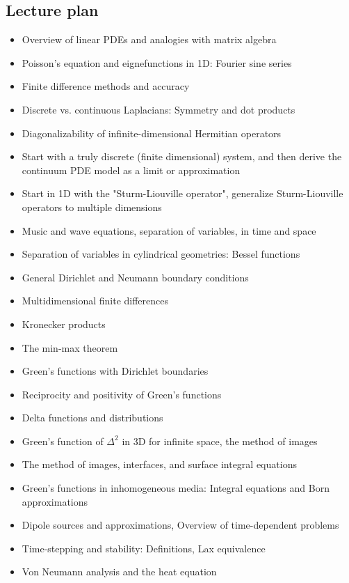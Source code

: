 \documentclass{article}
\theoremstyle{mytheoremstyle}
\theoremstyle{mytheoremstyle}
\theoremstyle{myproblemstyle}
\begin{document}
    \subsection{Lecture plan}
    \begin{itemize}
    	\item Overview of linear PDEs and analogies with matrix algebra
	\item Poisson's equation and eignefunctions in 1D: Fourier
		sine series
	\item Finite difference methods and accuracy
	\item Discrete vs. continuous Laplacians: Symmetry and dot products
	\item Diagonalizability of infinite-dimensional Hermitian operators
	\item Start with a truly discrete (finite dimensional) system,
		and then derive the continuum PDE model as a limit or
		approximation
	\item Start in 1D with the "Sturm-Liouville operator", generalize
		Sturm-Liouville operators to multiple dimensions
	\item Music and wave equations, separation of variables, in time
		and space
	\item Separation of variables in cylindrical geometries: Bessel
		functions
	\item General Dirichlet and Neumann boundary conditions
	\item Multidimensional finite differences
	\item Kronecker products
	\item The min-max theorem
	\item Green's functions with Dirichlet boundaries
	\item Reciprocity and positivity of Green's functions
	\item Delta functions and distributions
	\item Green's function of $ \Delta^2 $ in 3D for infinite space,
		the method of images
	\item The method of images, interfaces, and surface integral
		equations
	\item Green's functions in inhomogeneous media: Integral equations
		and Born approximations
	\item Dipole sources and approximations, Overview of time-dependent
		problems
	\item Time-stepping and stability: Definitions, Lax equivalence
	\item Von Neumann analysis and the heat equation

\end{itemize}
\end{document}
